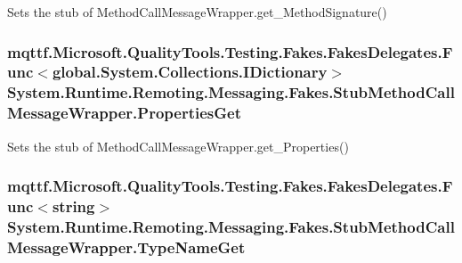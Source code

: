 Sets the stub of Method\-Call\-Message\-Wrapper.\-get\-\_\-\-Method\-Signature()

\hypertarget{class_system_1_1_runtime_1_1_remoting_1_1_messaging_1_1_fakes_1_1_stub_method_call_message_wrapper_a22798e06a75f0bebec87e794a61bdaff}{
\subsubsection[{Properties\-Get}]{\setlength{\rightskip}{0pt plus 5cm}mqttf.\-Microsoft.\-Quality\-Tools.\-Testing.\-Fakes.\-Fakes\-Delegates.\-Func$<$global.\-System.\-Collections.\-I\-Dictionary$>$ System.\-Runtime.\-Remoting.\-Messaging.\-Fakes.\-Stub\-Method\-Call\-Message\-Wrapper.\-Properties\-Get}}\label{class_system_1_1_runtime_1_1_remoting_1_1_messaging_1_1_fakes_1_1_stub_method_call_message_wrapper_a22798e06a75f0bebec87e794a61bdaff}


Sets the stub of Method\-Call\-Message\-Wrapper.\-get\-\_\-\-Properties()

\hypertarget{class_system_1_1_runtime_1_1_remoting_1_1_messaging_1_1_fakes_1_1_stub_method_call_message_wrapper_a0831eef50d30eb4e6f489eafd13d0e81}{
\subsubsection[{Type\-Name\-Get}]{\setlength{\rightskip}{0pt plus 5cm}mqttf.\-Microsoft.\-Quality\-Tools.\-Testing.\-Fakes.\-Fakes\-Delegates.\-Func$<$string$>$ System.\-Runtime.\-Remoting.\-Messaging.\-Fakes.\-Stub\-Method\-Call\-Message\-Wrapper.\-Type\-Name\-Get}}\label{class_system_1_1_runtime_1_1_remoting_1_1_messaging_1_1_fakes_1_1_stub_method_call_message_wrapper_a0831eef50d30eb4e6f489eafd13d0e81}



